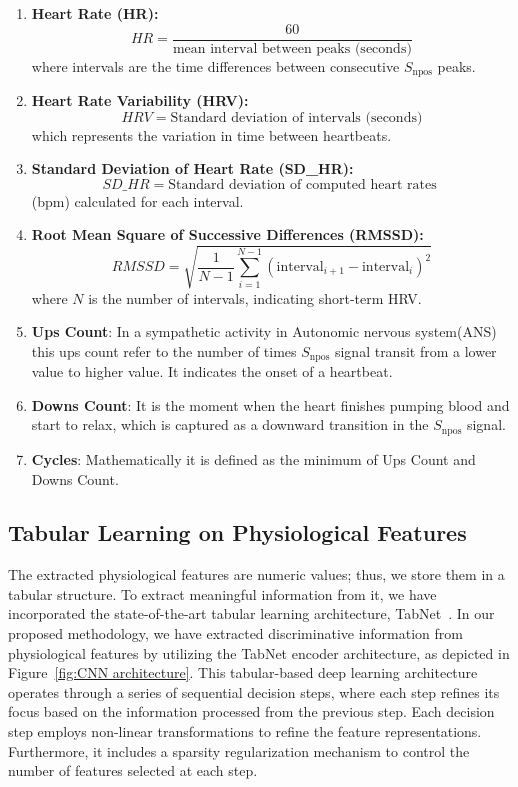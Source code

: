 \begin{enumerate}
\item 
\textbf{Heart Rate (HR):}
\[
HR = \frac{60}{\text{mean interval between peaks (seconds)}}
\]
where intervals are the time differences between consecutive $S_{\text{npos}}$ peaks.

\item 
\textbf{Heart Rate Variability (HRV):}
\[
HRV = \text{Standard deviation of intervals (seconds)}
\]
which represents the variation in time between heartbeats.

\item 
\textbf{Standard Deviation of Heart Rate (SD\_HR):}
\[
SD\_HR = \text{Standard deviation of computed heart rates 
}
\]
(bpm) calculated for each interval.

\item 
\textbf{Root Mean Square of Successive Differences (RMSSD):}
\[
RMSSD = \sqrt{\frac{1}{N-1} \sum_{i=1}^{N-1} (\text{interval}_{i+1} - \text{interval}_i)^2}
\]
where \( N \) is the number of intervals, indicating short-term HRV.

\item 
\textbf{Ups Count}: In a sympathetic activity in Autonomic nervous system(ANS) this ups count refer to the number of times  $S_{\text{npos}}$ signal transit from a lower value to higher value. It indicates the onset of a heartbeat.

\item 
\textbf{Downs Count}: It is the moment when the heart finishes pumping blood and start to relax, which is captured as a downward transition in the $S_{\text{npos}}$ signal.

\item 
\textbf{Cycles}: Mathematically it is defined as the minimum of Ups Count and Downs Count.

\end{enumerate}





\subsection{Tabular Learning on Physiological Features}

The extracted physiological features are numeric values; thus, we store them in a tabular structure. To extract meaningful information from it, we have incorporated the state-of-the-art tabular learning architecture, TabNet~\cite{arik2021tabnet}. In our proposed methodology, we have extracted discriminative information from physiological features by utilizing the TabNet encoder architecture, as depicted in Figure~\ref{fig:CNN architecture}. This tabular-based deep learning architecture operates through a series of sequential decision steps, where each step refines its focus based on the information processed from the previous step. Each decision step employs non-linear transformations to refine the feature representations. Furthermore, it includes a sparsity regularization mechanism to control the number of features selected at each step. 

